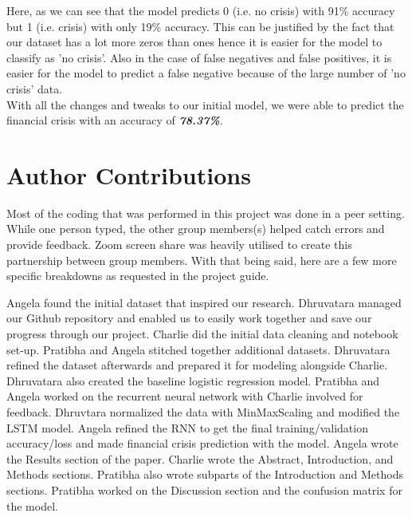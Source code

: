 \documentclass[12pt]{article}
\begin{document}
Here, as we can see that the model predicts 0 (i.e. no crisis) with 91\% accuracy but 1 (i.e. crisis) with only 19\% accuracy. This can be justified by the fact that our dataset has a lot more zeros than ones hence it is easier for the model to classify as 'no crisis'. Also in the case of false negatives and false positives, it is easier for the model to predict a false negative because of the large number of 'no crisis' data.\\
With all the changes and tweaks to our initial model, we were able to predict the financial crisis with an accuracy of \textbf{\textit{78.37\%}}.

\section{Author Contributions}
Most of the coding that was performed in this project was done in a peer setting. While one person typed, the other group members(s) helped catch errors and provide feedback. Zoom screen share was heavily utilised to create this partnership between group members. With that being said, here are a few more specific breakdowns as requested in the project guide. 

Angela found the initial dataset that inspired our research. Dhruvatara managed our Github repository and enabled us to easily work together and save our progress through our project. Charlie did the initial data cleaning and notebook set-up. Pratibha and Angela stitched together additional datasets. Dhruvatara refined the dataset afterwards and prepared it for modeling alongside Charlie. Dhruvatara also created the baseline logistic regression model. Pratibha and Angela worked on the recurrent neural network with Charlie involved for feedback. Dhruvtara normalized the data with MinMaxScaling and modified the LSTM model. Angela refined the RNN to get the final training/validation accuracy/loss and made financial crisis prediction with the model. Angela wrote the Results section of the paper. Charlie wrote the Abstract, Introduction, and Methods sections. Pratibha also wrote subparts of the Introduction and Methods sections. Pratibha worked on the Discussion section and the confusion matrix for the model. 



\printbibliography
\end{document}
